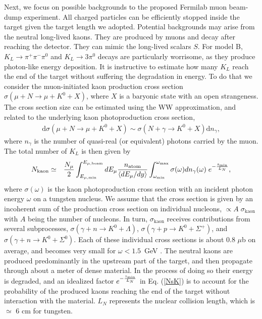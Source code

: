 \documentclass[prd,onecolumn,notitlepage,
nofootinbib,aps,tightenlines,
preprintnumbers,amsmath,amssymb,amsfonts,showpacs,superscriptaddress]{revtex4-1}
\renewcommand{\d}{\text{d}}
\newcommand{\be}{\begin{eqnarray}}
\newcommand{\ee}{\end{eqnarray}}
\renewcommand{\d}{\text{d}}
\begin{document}
Next, we focus on possible backgrounds to the proposed Fermilab muon beam-dump experiment. 
All charged particles can be efficiently stopped inside the target given the target length we adopted. Potential backgrounds  may arise from the neutral long-lived kaons. They are produced by muons and  decay  after reaching the detector. They can mimic the long-lived scalars $S$. For  model B, 
$K_L \to \pi^+ \pi^- \pi^0$ and $K_L \to 3\pi^0$ decays are particularly 
worrisome, as they produce photon-like energy deposition.  
It is instructive to estimate how many $K_L$ reach the end of the target without suffering the degradation in 
energy. To do that we consider the muon-initiated kaon production cross section
$\sigma(\mu+N \to \mu + K^0 + X)$, where $X$ is 
a baryonic state with an open strangeness. The cross section size can be estimated using the WW approximation, and related to the underlying kaon photoproduction 
cross section,
\be
\d\sigma(\mu+N \to \mu + K^0 + X)  \sim \sigma(N +\gamma \to K^0 + X) \d n_\gamma,
\ee
where $n_\gamma$ is the number of quasi-real (or equivalent) photons carried by the muon.
The total number of $K_L$  is then given by
\be
\label{NsK}
N_\text{kaon} &\simeq &  \frac{N_\mu}{2}\int_{E_{\mu,\min}}^{E_{\mu, \text{beam}}} dE_\mu \frac{n_{\rm atom}}{\langle dE_\mu/dy \rangle} \int_{\omega_{\min}}^{\omega_{\max}} \sigma(\omega) dn_\gamma (\omega)\;e^{-{z_{\min}\over L_N}},
\ee
where $\sigma(\omega)$ is the kaon photoproduction cross section with an incident photon energy $\omega$ on a tungsten nucleus. We assume 
that the cross section is given by an incoherent sum of the production cross section 
on individual nucleons, $\propto A \; \sigma_\text{kaon}$ with $A$ being the number of nucleons. In turn,  $\sigma_\text{kaon}$ receives contributions from 
several subprocesses, $
\sigma(\gamma+n\to K^0 + \Lambda)$, $\sigma(\gamma+p\to K^0 + \Sigma^+) $, 
and $\sigma(\gamma+n\to K^0 + \Sigma^0).$
Each of these individual cross sections is about 0.8 $\mu$b on average, 
and becomes very small for $\omega < 1.5$~GeV \cite{Goers:1999sw,Tsukada:2007jy,Kaon}. 
The neutral kaons are produced predominantly in the upstream part of the target, and then 
propagate through about a meter of dense material. In the process of doing so their energy is degraded, 
and an idealized factor $e^{-{z_{\min}\over L_N}}$ in Eq. (\ref{NsK}) is to account for the probability of the produced kaons reaching the end of the target without interaction with the material. $L_N$ represents the nuclear collision length, which is $\simeq$ 6 cm for tungsten. 
\end{document}
